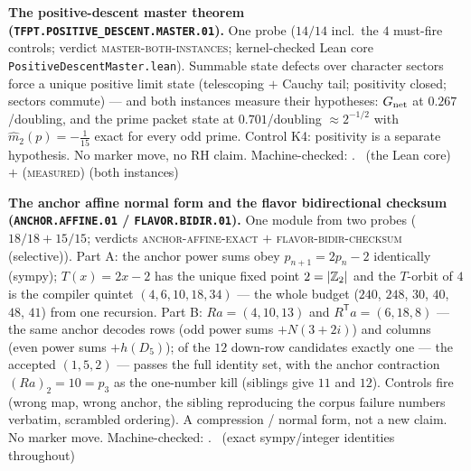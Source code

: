 \par\smallskip\noindent\textbf{The positive-descent master theorem
(\texttt{TFPT.POSITIVE\_DESCENT.MASTER.01}).}
One probe ($14/14$ incl.\ the $4$ must-fire controls; verdict
\textsc{master-both-instances}; kernel-checked Lean core
\texttt{PositiveDescentMaster.lean}).  Summable state defects over
character sectors force a unique positive limit state (telescoping
$+$ Cauchy tail; positivity closed; sectors commute) --- and both
instances measure their hypotheses: $G_{\rm net}$ at
$0.267$/doubling, and the prime packet state at $0.701$/doubling
$\approx2^{-1/2}$ with $\hat m_2(p)=-\tfrac1{15}$ exact for every
odd prime.  Control K4: positivity is a separate hypothesis.
No marker move, no RH claim.
Machine-checked: .
\mE\ (the Lean core) $+$ (\textsc{measured}) (both instances)
\par\smallskip

\par\smallskip\noindent\textbf{The anchor affine normal form and
the flavor bidirectional checksum (\texttt{ANCHOR.AFFINE.01} /
\texttt{FLAVOR.BIDIR.01}).}
One module from two probes ($18/18 + 15/15$; verdicts
\textsc{anchor-affine-exact} $+$ \textsc{flavor-bidir-checksum}
(selective)).  Part A: the anchor power sums obey
$p_{n+1} = 2p_n - 2$ identically (sympy); $T(x) = 2x - 2$ has the
unique fixed point $2 = |\mathbb{Z}_2|$ and the $T$-orbit of $4$ is the
compiler quintet $(4, 6, 10, 18, 34)$ --- the whole budget
($240$, $248$, $30$, $40$, $48$, $41$) from one recursion.  Part
B: $Ra = (4, 10, 13)$ and $R^{\mathsf T}a = (6, 18, 8)$ --- the
same anchor decodes rows (odd power sums $+ N(3{+}2i)$) and
columns (even power sums $+ h(D_5)$); of the $12$ down-row
candidates exactly one --- the accepted $(1,5,2)$ --- passes the
full identity set, with the anchor contraction $(Ra)_2 = 10 =
p_3$ as the one-number kill (siblings give $11$ and $12$).
Controls fire (wrong map, wrong anchor, the sibling reproducing
the corpus failure numbers verbatim, scrambled ordering).  A
compression / normal form, not a new claim.  No marker move.
Machine-checked: .
\mE\ (exact sympy/integer identities throughout)
\par\smallskip

